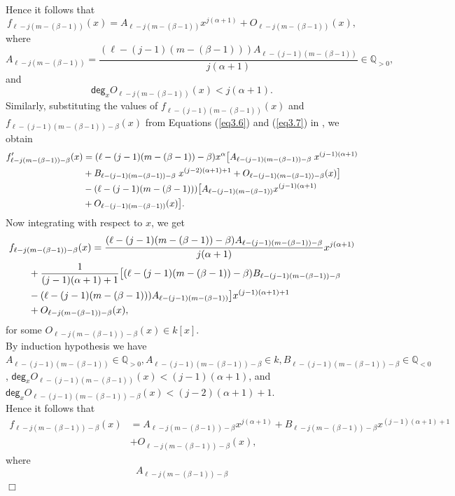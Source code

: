 \documentclass[12pt,reqno]{amsart}
\renewcommand{\deg}{\mathsf{deg}}
\numberwithin{thm}{section}
\theoremstyle{definition}
\numberwithin{equation}{thm}
\renewenvironment{proof}{\par\noindent {\em Proof:}}{\hfill$\Box$\medskip}
\theoremstyle{plain}
\begin{document}
\begin{proof}
Hence it follows that
\[
f_{\ell-j(m-(\beta-1))}(x)
=A_{\ell-j(m-(\beta-1))}x^{j(\alpha+1)}+O_{\ell-j(m-(\beta-1))}(x),
\]
where
\[
A_{\ell-j(m-(\beta-1))}
=\frac{(\ell-(j-1)(m-(\beta-1)))A_{\ell-(j-1)(m-(\beta-1))}}{j(\alpha+1)}
\in\mathbb{Q}_{>0},
\]
and
\[
\deg_x O_{\ell-j(m-(\beta-1))}(x)<j(\alpha+1).
\]
Similarly, substituting the values of $f_{\ell-(j-1)(m-(\beta-1))}(x)$ and
$f_{\ell-(j-1)(m-(\beta-1))-\beta}(x)$ from Equations (\ref{eq3.6}) and (\ref{eq3.7}) in , we obtain
\begin{align}
f'_{\ell-j(m-(\beta-1))-\beta}(x) &=(\ell-(j-1)(m-(\beta-1))-\beta)x^\alpha
\big[A_{\ell-(j-1)(m-(\beta-1))-\beta}\;x^{(j-1)(\alpha+1)}\notag \\
& +B_{\ell-(j-1)(m-(\beta-1))-\beta}\;x^{(j-2)(\alpha+1)+1}+O_{\ell-(j-1)(m-(\beta-1))-\beta}(x)\big]\notag \\
&-(\ell-(j-1)(m-(\beta-1)))\big[A_{\ell-(j-1)(m-(\beta-1))}x^{(j-1)(\alpha+1)} \notag\\
&+O_{\ell-(j-1)(m-(\beta-1))}(x)\big].\notag
\end{align}
Now integrating with respect to $x$, we get
\begin{align}
&f_{\ell-j(m-(\beta-1))-\beta}(x) = \frac{(\ell-(j-1)(m-(\beta-1))-\beta)A_{\ell-(j-1)(m-(\beta-1))-\beta}}{j(\alpha+1)}
x^{j(\alpha+1)}\notag \\
&\qquad+\frac{1}{(j-1)(\alpha+1)+1}\big[(\ell-(j-1)(m-(\beta-1))-\beta)B_{\ell-(j-1)(m-(\beta-1))-\beta}\notag \\
&\qquad-(\ell-(j-1)(m-(\beta-1)))A_{\ell-(j-1)(m-(\beta-1))}\big]x^{(j-1)(\alpha+1)+1}\notag\\
&\qquad+O_{\ell-j(m-(\beta-1))-\beta}(x),\notag
\end{align}
for some $O_{\ell-j(m-(\beta-1))-\beta}(x)\in k[x]$. \\ \noindent
By induction hypothesis we have $A_{\ell-(j-1)(m-(\beta-1))}\in \mathbb{Q}_{>0}, A_{\ell-(j-1)(m-(\beta-1))-\beta}\in k, B_{\ell-(j-1)(m-(\beta-1))-\beta}\in \mathbb{Q}_{<0}$,
$\deg_x O_{\ell-(j-1)(m-(\beta-1))}(x)<(j-1)(\alpha+1)$,
and $\deg_x O_{\ell-(j-1)(m-(\beta-1))-\beta}(x)<(j-2)(\alpha+1)+1$.\\
\noindent Hence it follows that 
\begin{align*}
f_{\ell-j(m-(\beta-1))-\beta}(x)
&=A_{\ell-j(m-(\beta-1))-\beta}x^{j(\alpha+1)}
+B_{\ell-j(m-(\beta-1))-\beta}x^{(j-1)(\alpha+1)+1}
\\
&+O_{\ell-j(m-(\beta-1))-\beta}(x),
\end{align*}
where
\[
A_{\ell-j(m-(\beta-1))-\beta}
\]
\end{proof}
\end{document}
